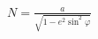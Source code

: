 \documentclass{standalone}
\begin{document}
    $N = \frac{a}{\sqrt{1 - e^2 {\sin^2 \varphi}}}$
\end{document}

